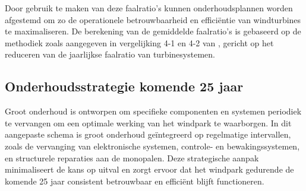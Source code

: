 Door gebruik te maken van deze faalratio's kunnen onderhoudsplannen worden afgestemd om zo de operationele betrouwbaarheid en efficiëntie van windturbines te maximaliseren. De berekening van de gemiddelde faalratio's is gebaseerd op de methodiek zoals aangegeven in vergelijking 4-1 en 4-2 van \cite{ding2010comparative}, gericht op het reduceren van de jaarlijkse faalratio van turbinesystemen.

\subsection{Onderhoudsstrategie komende 25 jaar}
Groot onderhoud is ontworpen om specifieke componenten en systemen periodiek te vervangen om een optimale werking van het windpark te waarborgen. In dit aangepaste schema is groot onderhoud geïntegreerd op regelmatige intervallen, zoals de vervanging van elektronische systemen, controle- en bewakingssystemen, en structurele reparaties aan de monopalen. Deze strategische aanpak minimaliseert de kans op uitval en zorgt ervoor dat het windpark gedurende de komende 25 jaar consistent betrouwbaar en efficiënt blijft functioneren.


